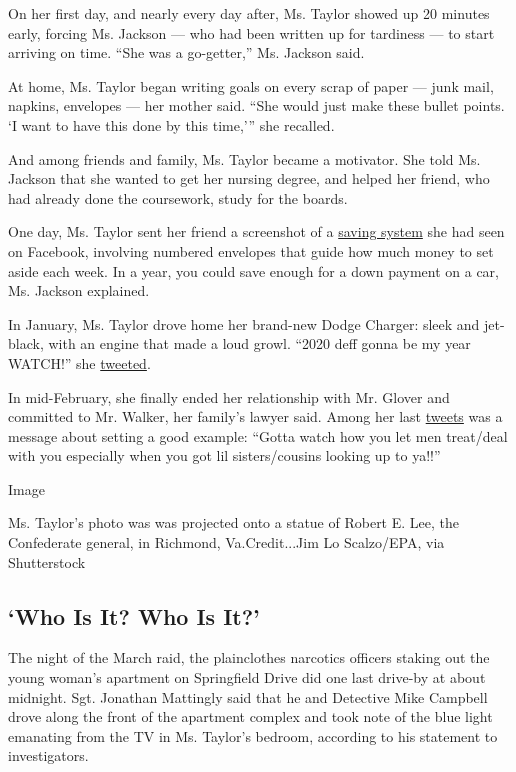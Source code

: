 On her first day, and nearly every day after, Ms. Taylor showed up 20
minutes early, forcing Ms. Jackson --- who had been written up for
tardiness --- to start arriving on time. ``She was a go-getter,'' Ms.
Jackson said.

At home, Ms. Taylor began writing goals on every scrap of paper --- junk
mail, napkins, envelopes --- her mother said. ``She would just make
these bullet points. `I want to have this done by this time,''' she
recalled.

And among friends and family, Ms. Taylor became a motivator. She told
Ms. Jackson that she wanted to get her nursing degree, and helped her
friend, who had already done the coursework, study for the boards.

One day, Ms. Taylor sent her friend a screenshot of a
\href{https://www.dailymail.co.uk/femail/article-7846813/Envelope-help-save-extra-5-050-end-2020.html}{saving
system} she had seen on Facebook, involving numbered envelopes that
guide how much money to set aside each week. In a year, you could save
enough for a down payment on a car, Ms. Jackson explained.

In January, Ms. Taylor drove home her brand-new Dodge Charger: sleek and
jet-black, with an engine that made a loud growl. ``2020 deff gonna be
my year WATCH!'' she
\href{https://twitter.com/PrettyN_Paidd/status/1192024507676078080}{tweeted}.

In mid-February, she finally ended her relationship with Mr. Glover and
committed to Mr. Walker, her family's lawyer said. Among her last
\href{https://twitter.com/PrettyN_Paidd/status/1231786160051060737}{tweets}
was a message about setting a good example: ``Gotta watch how you let
men treat/deal with you especially when you got lil sisters/cousins
looking up to ya!!''

Image

Ms. Taylor's photo was was projected onto a statue of Robert E. Lee, the
Confederate general, in Richmond, Va.Credit...Jim Lo Scalzo/EPA, via
Shutterstock

\hypertarget{who-is-it-who-is-it}{%
\subsection{`Who Is It? Who Is It?'}\label{who-is-it-who-is-it}}

The night of the March raid, the plainclothes narcotics officers staking
out the young woman's apartment on Springfield Drive did one last
drive-by at about midnight. Sgt. Jonathan Mattingly said that he and
Detective Mike Campbell drove along the front of the apartment complex
and took note of the blue light emanating from the TV in Ms. Taylor's
bedroom, according to his statement to investigators.

